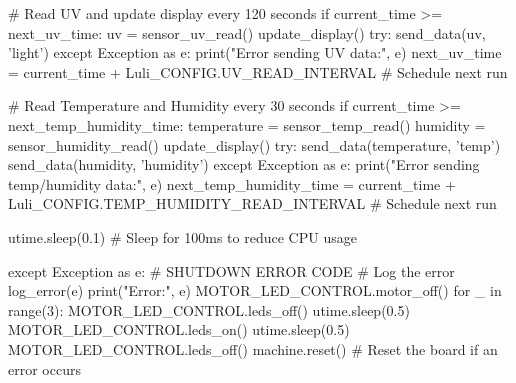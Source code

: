 \documentclass[12pt]{article} %
\begin{document}
\begin{pythoncode}[caption={Main MicroPython Code}]
            # Read UV and update display every 120 seconds
            if current_time >= next_uv_time:
                uv = sensor_uv_read()
                update_display()
                try:
                    send_data(uv, 'light')
                except Exception as e:
                    print("Error sending UV data:", e)
                next_uv_time = current_time + Luli_CONFIG.UV_READ_INTERVAL  # Schedule next run

            # Read Temperature and Humidity every 30 seconds
            if current_time >= next_temp_humidity_time:
                temperature = sensor_temp_read()
                humidity = sensor_humidity_read()
                update_display()
                try:
                    send_data(temperature, 'temp')
                    send_data(humidity, 'humidity')
                except Exception as e:
                    print("Error sending temp/humidity data:", e)
                next_temp_humidity_time = current_time + Luli_CONFIG.TEMP_HUMIDITY_READ_INTERVAL # Schedule next run

            
            

            utime.sleep(0.1)  # Sleep for 100ms to reduce CPU usage

    except Exception as e:
        # SHUTDOWN ERROR CODE
        # Log the error
        log_error(e)
        print("Error:", e)
        MOTOR_LED_CONTROL.motor_off()
        for _ in range(3):
            MOTOR_LED_CONTROL.leds_off()
            utime.sleep(0.5)
            MOTOR_LED_CONTROL.leds_on()
            utime.sleep(0.5)
        MOTOR_LED_CONTROL.leds_off()
        machine.reset() # Reset the board if an error occurs

\end{pythoncode}
\end{document}
